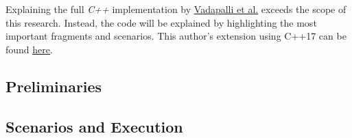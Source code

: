 \label{sec:ExistingImplementation}
Explaining the full \textit{C++} implementation by \underline{\hyperlink{https://git-crysp.uwaterloo.ca/iang/prac.git}{Vadapalli et al.}} \cite{vadapalli2023duoram} exceeds the scope of this research.
Instead, the code will be explained by highlighting the most important fragments and scenarios.
This author's extension using C++17 can be found \underline{\hyperlink{https://github.com/FelixWeik/PrivateRandomAccessComputations}{here}}.

\subsection*{Preliminaries}
\label{sub:ImplementationPreliminaries}

\subsection*{Scenarios and Execution} \label{sub:implementationScenarios}
